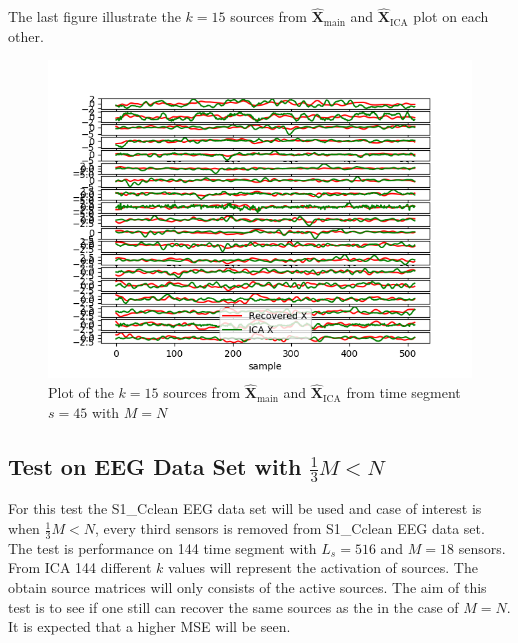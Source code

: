 The last figure illustrate the $k = 15$ sources from $\hat{\mathbf{X}}_{\text{main}}$ and $\hat{\mathbf{X}}_{\text{ICA}}$ plot on each other.
\begin{figure}[H]
    \centering
	\includegraphics[scale=0.5]{figures/ch_7/Sources_M=N.png}
	\caption{Plot of the $k = 15$ sources from $\hat{\mathbf{X}}_{\text{main}}$ and $\hat{\mathbf{X}}_{\text{ICA}}$ from time segment $s = 45$ with $M=N$}
	\label{fig:M=N_3}
\end{figure} 
\noindent





\subsection{Test on EEG Data Set with $\frac{1}{3} M<N$}
For this test the S1\_Cclean EEG data set will be used and case of interest is when $\frac{1}{3} M < N$, every third sensors is removed from S1\_Cclean EEG data set. The test is performance on 144 time segment with $L_s = 516$ and $M = 18$ sensors. From ICA 144 different $k$ values will represent the activation of sources. The obtain source matrices will only consists of the active sources.
The aim of this test is to see if one still can recover the same sources as the in the case of $M=N$. It is expected that a higher MSE will be seen.

